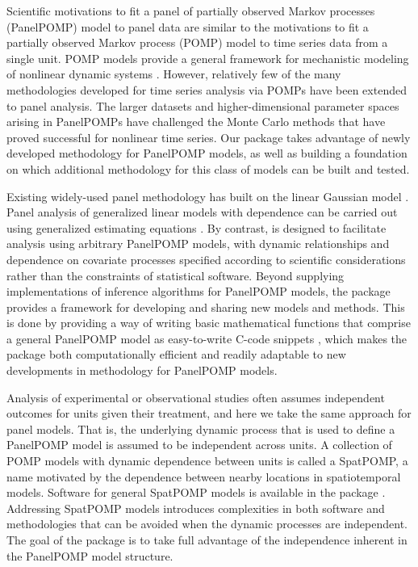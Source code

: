 Scientific motivations to fit a panel of partially observed Markov processes (PanelPOMP) model to panel data \citep{breto20} are similar to the motivations to fit a partially observed Markov process (POMP) model to time series data from a single unit.
POMP models provide a general framework for mechanistic modeling of nonlinear dynamic systems \citep{breto09}.
However, relatively few of the many methodologies developed for time series analysis via POMPs have been extended to panel analysis.
The larger datasets and higher-dimensional parameter spaces arising in PanelPOMPs have challenged the Monte Carlo methods that have proved successful for nonlinear time series.
Our  package takes advantage of newly developed methodology for PanelPOMP models, as well as building a foundation on which additional methodology for this class of models can be built and tested.

Existing widely-used panel methodology has built on the linear Gaussian model \citep{croissant08}.
Panel analysis of generalized linear models with dependence can be carried out using generalized estimating equations \citep{halekoh06}.
By contrast,  is designed to facilitate analysis using arbitrary PanelPOMP models, with dynamic relationships and dependence on covariate processes specified according to scientific considerations rather than the constraints of statistical software.
Beyond supplying implementations of inference algorithms for PanelPOMP models, the  package provides a framework for developing and sharing new models and methods.
This is done by providing a way of writing basic mathematical functions that comprise a general PanelPOMP model as easy-to-write C-code snippets \citep{king16}, which makes the  package both computationally efficient and readily adaptable to new developments in methodology for PanelPOMP models.

Analysis of experimental or observational studies often assumes independent outcomes for units given their treatment, and here we take the same approach for panel models.
That is, the underlying dynamic process that is used to define a PanelPOMP model is assumed to be independent across units.
A collection of POMP models with dynamic dependence between units is called a SpatPOMP, a name motivated by the dependence between nearby locations in spatiotemporal models.
Software for general SpatPOMP models is available in the  package \citep{asfaw24}.
Addressing SpatPOMP models introduces complexities in both software and methodologies that can be avoided when the dynamic processes are independent.
The goal of the  package is to take full advantage of the independence inherent in the PanelPOMP model structure.

